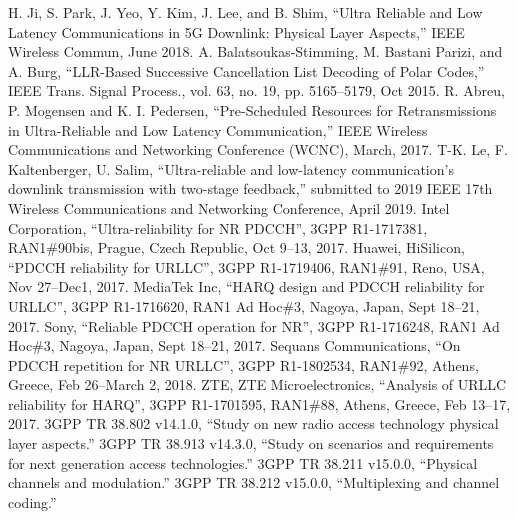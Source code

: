 \documentclass[conference,10pt]{IEEEtran}
\begin{document}
\begin{thebibliography}{00}
 H. Ji, S. Park, J. Yeo, Y. Kim, J. Lee, and B. Shim, ``Ultra Reliable and Low Latency Communications in 5G Downlink: Physical Layer Aspects,''  IEEE Wireless Commun, June 2018.
 A. Balatsoukas-Stimming, M. Bastani Parizi, and A. Burg, ``LLR-Based Successive Cancellation List Decoding of Polar Codes,'' IEEE Trans. Signal Process., vol. 63, no. 19, pp. 5165–5179, Oct 2015.
 R. Abreu, P. Mogensen and K. I. Pedersen, ``Pre-Scheduled Resources for Retransmissions in Ultra-Reliable and Low Latency Communication,'' IEEE Wireless Communications and Networking Conference (WCNC), March, 2017.
 T-K. Le, F. Kaltenberger, U. Salim, ``Ultra-reliable and low-latency communication's downlink transmission with two-stage feedback,'' submitted to 2019 IEEE 17th Wireless Communications and Networking Conference, April 2019.
 Intel Corporation, ``Ultra-reliability for NR PDCCH'', 3GPP R1-1717381, RAN1\#90bis, Prague, Czech Republic, Oct 9--13, 2017.
 Huawei, HiSilicon, ``PDCCH reliability for URLLC'', 3GPP R1-1719406, RAN1\#91, Reno, USA, Nov 27--Dec1, 2017.
 MediaTek Inc, ``HARQ design and PDCCH reliability for URLLC'', 3GPP R1-1716620, RAN1 Ad Hoc\#3, Nagoya, Japan, Sept 18--21, 2017.
 Sony, ``Reliable PDCCH operation for NR'', 3GPP R1-1716248, RAN1 Ad Hoc\#3, Nagoya, Japan, Sept 18--21, 2017.
 Sequans Communications, ``On PDCCH repetition for NR URLLC'', 3GPP R1-1802534, RAN1\#92, Athens, Greece, Feb 26--March 2, 2018.
 ZTE, ZTE Microelectronics, ``Analysis of URLLC reliability for HARQ'', 3GPP R1-1701595, RAN1\#88, Athens, Greece, Feb 13--17, 2017.
 3GPP TR 38.802 v14.1.0, ``Study on new radio access technology physical layer aspects.''
 3GPP TR 38.913 v14.3.0, ``Study on scenarios and requirements for next generation access technologies.''
 3GPP TR 38.211 v15.0.0, ``Physical channels and modulation.''
 3GPP TR 38.212 v15.0.0, ``Multiplexing and channel coding.''

\end{thebibliography}
\vspace{12pt}
\end{document}
